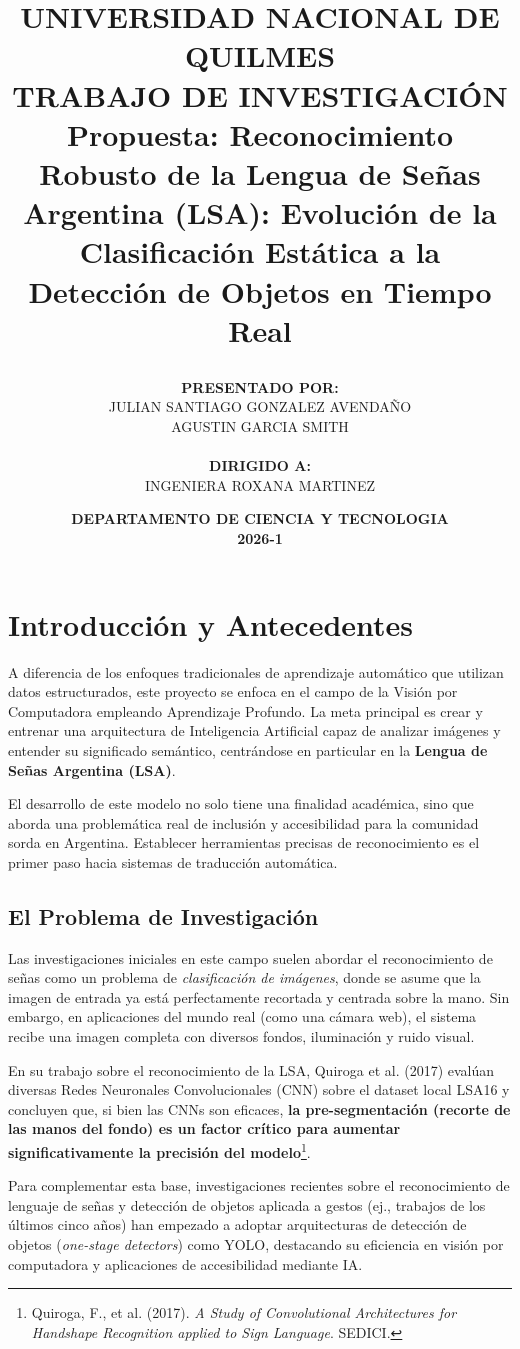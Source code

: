 \documentclass[a4paper,12pt]{article}
\title{
    \vspace{-2cm}
    \begin{center}
        \textbf{\Large UNIVERSIDAD NACIONAL DE QUILMES} \\
        \vspace{1cm}
        \vspace{1cm}
        \textbf{\Large TRABAJO DE INVESTIGACIÓN} \\
        \vspace{1.5cm}
        \textbf{Propuesta: Reconocimiento Robusto de la Lengua de Señas Argentina (LSA): Evolución de la Clasificación Estática a la Detección de Objetos en Tiempo Real} \\
    \end{center}
    \vspace{1.5cm}
}
\author{
    \begin{tabular}{c}
        \textbf{PRESENTADO POR:} \\
        JULIAN SANTIAGO GONZALEZ AVENDAÑO \\
        AGUSTIN GARCIA SMITH \\
        \vspace{1cm} \\
        \textbf{DIRIGIDO A:} \\
        INGENIERA ROXANA MARTINEZ \\
    \end{tabular}
}
\date{
    \vspace{2cm}
    \textbf{DEPARTAMENTO DE CIENCIA Y TECNOLOGIA} \\
    \vspace{0.5cm}
    \textbf{2026-1}
}
\begin{document}
\maketitle
\thispagestyle{empty}
\newpage

\section{Introducción y Antecedentes}

A diferencia de los enfoques tradicionales de aprendizaje automático que utilizan datos estructurados, este proyecto se enfoca en el campo de la Visión por Computadora empleando Aprendizaje Profundo. La meta principal es crear y entrenar una arquitectura de Inteligencia Artificial capaz de analizar imágenes y entender su significado semántico, centrándose en particular en la \textbf{Lengua de Señas Argentina (LSA)}.

El desarrollo de este modelo no solo tiene una finalidad académica, sino que aborda una problemática real de inclusión y accesibilidad para la comunidad sorda en Argentina. Establecer herramientas precisas de reconocimiento es el primer paso hacia sistemas de traducción automática.

\subsection{El Problema de Investigación}

Las investigaciones iniciales en este campo suelen abordar el reconocimiento de señas como un problema de \textit{clasificación de imágenes}, donde se asume que la imagen de entrada ya está perfectamente recortada y centrada sobre la mano. Sin embargo, en aplicaciones del mundo real (como una cámara web), el sistema recibe una imagen completa con diversos fondos, iluminación y ruido visual. 

En su trabajo sobre el reconocimiento de la LSA, Quiroga et al. (2017) evalúan diversas Redes Neuronales Convolucionales (CNN) sobre el dataset local LSA16 y concluyen que, si bien las CNNs son eficaces, \textbf{la pre-segmentación (recorte de las manos del fondo) es un factor crítico para aumentar significativamente la precisión del modelo}\footnote{Quiroga, F., et al. (2017). \textit{A Study of Convolutional Architectures for Handshape Recognition applied to Sign Language}. SEDICI.}.

Para complementar esta base, investigaciones recientes sobre el reconocimiento de lenguaje de señas y detección de objetos aplicada a gestos (ej., trabajos de los últimos cinco años) han empezado a adoptar arquitecturas de detección de objetos (\textit{one-stage detectors}) como YOLO, destacando su eficiencia en visión por computadora y aplicaciones de accesibilidad mediante IA.
\end{document}
